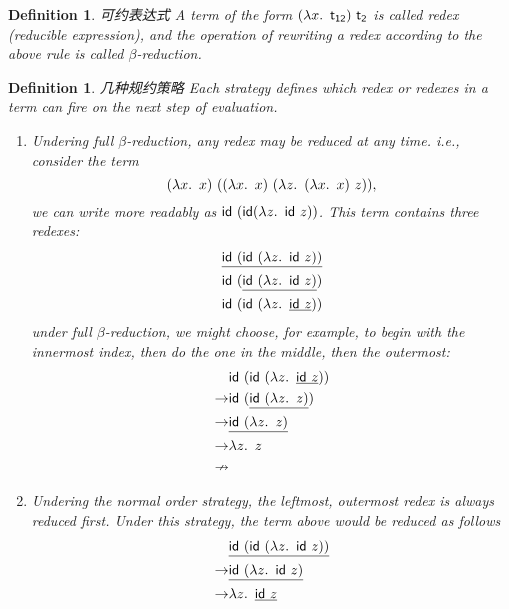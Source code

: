 \documentclass{article}
\theoremstyle{plain}
\newtheorem{definition}[theorem]{Definition}
\theoremstyle{nonumberplain}
\newcommand{\lam}[2]{\ensuremath{\lambda #1\ldotp~ #2}} %
\newcommand{\term}[1]{\ensuremath\mathsf{#1}}
\begin{document}
\begin{definition}
\rm {\color{red} 可约表达式} A term of the form $(\lam{x}{\term{t_{12}}})~\term{t_2}$ is called {\color{red} redex} (reducible expression), and the operation of rewriting a redex according to the above rule is called {\color{red} $\beta$-reduction}.
\end{definition}

\begin{definition}
\rm {\color{red} 几种规约策略} Each strategy defines which redex or redexes in a term can fire on the next step of evaluation. 
\begin{enumerate}
	\item Undering {\color{red} full $\beta$-reduction}, any redex may be reduced at any time. i.e., consider the term
	$$
	(\lam{x}{x})~((\lam{x}{x})~(\lam{z}{(\lam{x}{x})~z})),
	$$
	we can write more readably as $\term{id}~(\term{id}(\lam{z}{\term{id}}~z))$. This term contains three redexes:
	$$
	\begin{aligned}
	\underline{\term{id}~(\term{id}~(\lam{z}{\term{id}}~z))} \\
	\term{id}~(\underline{\term{id}~(\lam{z}{\term{id}}~z)}) \\
	\term{id}~(\term{id}~(\lam{z}{\underline{\term{id}~z}}))
	\end{aligned}
	$$
	under full $\beta$-reduction, we might choose, for example, to begin with the innermost index, then do the one in the middle, then the outermost:
	$$
	\begin{aligned}
	&\term{id}~(\term{id}~(\lam{z}{\underline{\term{id}~z}})) \\
	\rightarrow & \term{id}~(\underline{\term{id}~(\lam{z}{z})}) \\
	\rightarrow & \underline{\term{id}~(\lam{z}{z})} \\
	\rightarrow & \lam{z}{z} \\
	\nrightarrow
	\end{aligned}
	$$
	\item Undering the {\color{red} normal order} strategy, the leftmost, outermost redex is always reduced first. Under this strategy, the term above would be reduced as follows
	$$
	\begin{aligned}
	& \underline{\term{id}~(\term{id}~(\lam{z}{\term{id}~z}))} \\
	\rightarrow & \underline{\term{id}~(\lam{z}{\term{id}}~z)} \\
	\rightarrow & \lam{z}{\underline{\term{id}~z}} \\

\end{aligned}$$
\end{enumerate}
\end{definition}
\end{document}
